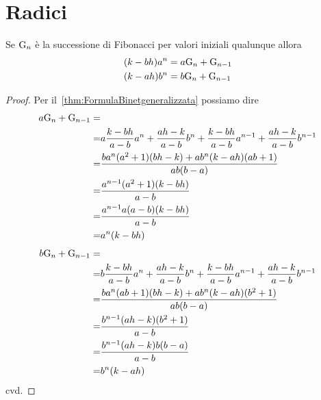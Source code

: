 \section{Radici}
\begin{thm}[Potenze di $a$ e $b$]\label{thm:FibRimuovipotab}
	Se $\mathrm{G}_{n}$  è la successione di Fibonacci per valori iniziali qualunque 
	allora 
	\begin{align*}
		(k-bh)a^n={}&a\mathrm{G}_{n}+\mathrm{G}_{n-1}\\
		(k-ah)b^n={}&b\mathrm{G}_{n}+\mathrm{G}_{n-1}\\
	\end{align*}
\end{thm}
\begin{proof}
	Per il~\vref{thm:FormulaBinetgeneralizzata} possiamo dire
	\begin{align*}
		a\mathrm{G}_{n}+\mathrm{G}_{n-1}=&\\
	=&a\dfrac{k-bh}{a-b}a^{n}+\dfrac{ah-k}{a-b}b^{n}+
	\dfrac{k-bh}{a-b}a^{n-1}+\dfrac{ah-k}{a-b}b^{n-1}\\
	=&\dfrac{ba^n(a^2+1)(bh-k)+ab^n(k-ah)(ab+1)}{ab(b-a)}\\
	=&\dfrac{a^{n-1}(a^2+1)(k-bh)}{a-b}\\
	=&\dfrac{a^{n-1}a(a-b)(k-bh)}{a-b}\\
	=&a^{n}(k-bh)\\
	\end{align*}
\begin{align*}
	b\mathrm{G}_{n}+\mathrm{G}_{n-1}=&\\
	=&b\dfrac{k-bh}{a-b}a^{n}+\dfrac{ah-k}{a-b}b^{n}+
	\dfrac{k-bh}{a-b}a^{n-1}+\dfrac{ah-k}{a-b}b^{n-1}\\
	=&\dfrac{ba^n(ab+1)(bh-k)+ab^n(k-ah)(b^2+1)}{ab(b-a)}\\
	=&\dfrac{b^{n-1}(ah-k)(b^2+1)}{a-b}\\
	=&\dfrac{b^{n-1}(ah-k)b(b-a)}{a-b}\\
	=&b^{n}(k-ah)\\
\end{align*}
cvd.
\end{proof}
